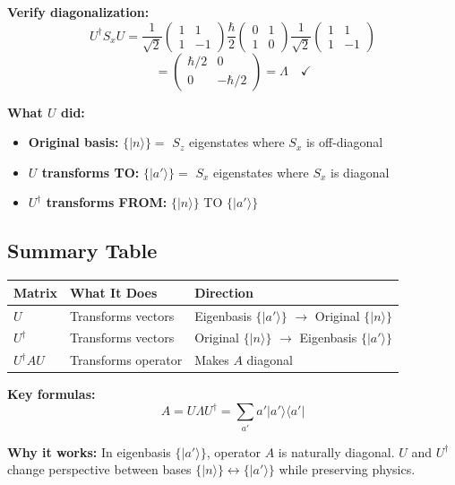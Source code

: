 \documentclass[11pt,a4paper]{article}
\begin{document}
\textbf{Verify diagonalization:}
$$U^\dagger S_x U = \frac{1}{\sqrt{2}}\begin{pmatrix} 1 & 1 \\ 1 & -1 \end{pmatrix} \frac{\hbar}{2}\begin{pmatrix} 0 & 1 \\ 1 & 0 \end{pmatrix} \frac{1}{\sqrt{2}}\begin{pmatrix} 1 & 1 \\ 1 & -1 \end{pmatrix}$$
$$= \begin{pmatrix} \hbar/2 & 0 \\ 0 & -\hbar/2 \end{pmatrix} = \Lambda \quad \checkmark$$

\textbf{What $U$ did:}
\begin{itemize}
\item \textbf{Original basis:} $\{|n\rangle\} = $ $S_z$ eigenstates where $S_x$ is off-diagonal
\item \textbf{$U$ transforms TO:} $\{|a'\rangle\} = $ $S_x$ eigenstates where $S_x$ is diagonal
\item \textbf{$U^\dagger$ transforms FROM:} $\{|n\rangle\}$ TO $\{|a'\rangle\}$
\end{itemize}

\subsection*{Summary Table}

\begin{center}
\begin{tabular}{|l|l|l|}
\hline
\textbf{Matrix} & \textbf{What It Does} & \textbf{Direction} \\
\hline
$U$ & Transforms vectors & Eigenbasis $\{|a'\rangle\}$ $\to$ Original $\{|n\rangle\}$ \\
$U^\dagger$ & Transforms vectors & Original $\{|n\rangle\}$ $\to$ Eigenbasis $\{|a'\rangle\}$ \\
$U^\dagger A U$ & Transforms operator & Makes $A$ diagonal \\
\hline
\end{tabular}
\end{center}

\textbf{Key formulas:}
$$A = U\Lambda U^\dagger = \sum_{a'} a' |a'\rangle\langle a'|$$

\textbf{Why it works:} In eigenbasis $\{|a'\rangle\}$, operator $A$ is naturally diagonal. $U$ and $U^\dagger$ change perspective between bases $\{|n\rangle\} \leftrightarrow \{|a'\rangle\}$ while preserving physics.
\end{document}
